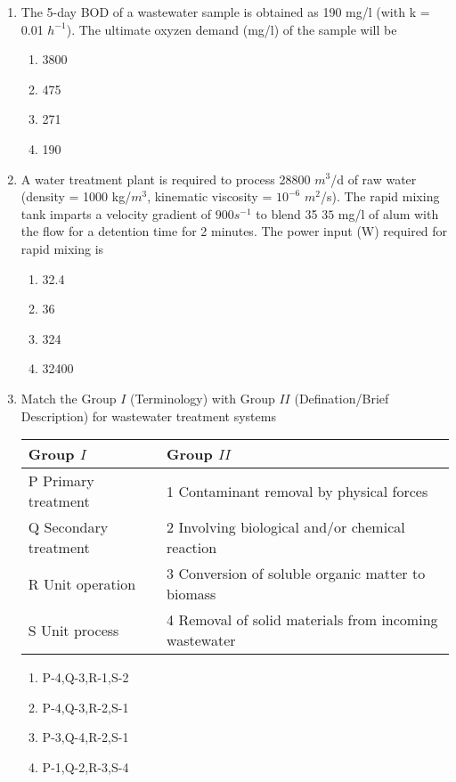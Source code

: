 \documentclass[journal]{IEEEtran}
\begin{document}
\begin{enumerate}
\begin{multicols}{2}
\begin{enumerate}
	\end{enumerate}
\end{multicols}
	\item The 5-day BOD of a wastewater sample is obtained as 190 mg/l (with k = 0.01 $h^{-1}$). The ultimate oxyzen demand (mg/l) of the sample will be
	\begin{multicols}{2}
	\begin{enumerate}
		\item 3800
		\item 475
		\item 271
		\item 190
	\end{enumerate}
\end{multicols}
\item A water treatment plant is required to process 28800 $m^3$/d of raw water (density = 1000 kg/$m^3$, kinematic viscosity = $10^{-6}$ $m^2$/s). The rapid mixing tank imparts a velocity gradient of $900 s^{-1}$ to blend 35 $35$ mg/l of alum with the flow for a detention time for 2 minutes. The power input (W) required for rapid mixing is
\begin{multicols}{2}
	\begin{enumerate}
		\item 32.4
		\item 36
		\item 324
		\item 32400
	\end{enumerate}
\end{multicols}
	\item Match the Group $I$ (Terminology) with Group $II$ (Defination/Brief Description) for wastewater treatment systems \\ 
\begin{tabular}{|l|l|}
	\hline 
	Group $I$ & Group $II$\\
	\hline
	P Primary treatment   & 1 Contaminant removal by physical forces \\
	\hline
	Q Secondary treatment & 2 Involving biological and/or chemical reaction\\
	\hline
	R Unit operation & 3 Conversion of soluble organic matter to biomass \\
	\hline
	S Unit process & 4 Removal of solid materials from incoming wastewater\\
	\hline

\end{tabular}
\begin{multicols}{2}
	\begin{enumerate}
		\item P-4,Q-3,R-1,S-2
		\item P-4,Q-3,R-2,S-1
		\item P-3,Q-4,R-2,S-1
		\item P-1,Q-2,R-3,S-4
	\end{enumerate}
\end{multicols}



\end{enumerate}
\end{document}
